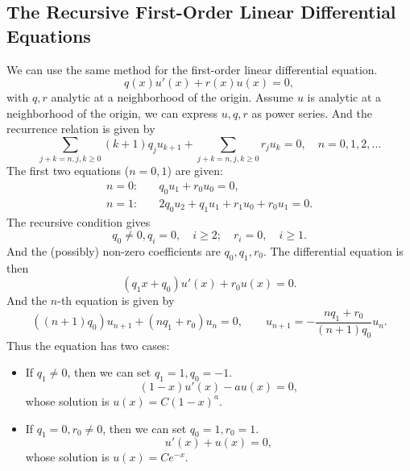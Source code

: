\documentclass[../main.tex]{subfiles}
\begin{document}
\subsection{The Recursive First-Order Linear Differential Equations}
We can use the same method for the first-order linear differential equation.
\begin{equation}
	q(x) u'(x) + r(x) u(x) = 0,
\end{equation}
with $q,r$ analytic at a neighborhood of the origin. Assume $u$ is analytic at a neighborhood of the origin, we can express $u,q,r$ as power series. And the recurrence relation is given by
\begin{equation}
	\sum_{j+k=n, j,k \geq 0} (k+1) q_j u_{k+1} + \sum_{j+k=n, j,k \geq 0} r_j u_k = 0, \quad n=0,1,2,\ldots
\end{equation}
The first two equations ($n=0,1$) are given:
\begin{equation*}
	\begin{aligned}
		n=0: \quad & q_0 u_1 + r_0 u_0 = 0, \\
		n=1: \quad & 2 q_0 u_2 + q_1 u_1 + r_1 u_0 + r_0 u_1 = 0.
	\end{aligned}
\end{equation*}
The recursive condition gives
\begin{equation*}
	q_0\neq 0, q_i=0, \quad i \geq 2; \quad r_i=0, \quad i \geq 1.
\end{equation*}
And the (possibly) non-zero coefficients are $q_0, q_1, r_0$. The differential equation is then
\begin{equation}
	(q_1 x + q_0) u'(x) + r_0 u(x) = 0.
\end{equation}
And the $n$-th equation is given by
\begin{equation}
	((n+1) q_0) u_{n+1} + (n q_1 + r_0) u_n = 0, \qquad u_{n+1} = -\frac{n q_1 + r_0}{(n+1) q_0} u_n.
\end{equation}
Thus the equation has two cases:
\begin{itemize}
	\item If $q_1 \neq 0$, then we can set $q_1=1, q_0=-1$.
		\begin{equation}
			(1 - x) u'(x) - a u(x) = 0,
		\end{equation}
		whose solution is $u(x) = C (1 - x)^a$.
	\item If $q_1=0, r_0 \neq 0$, then we can set $q_0=1, r_0=1$.
		\begin{equation}
			u'(x) + u(x) = 0,
		\end{equation}
		whose solution is $u(x) = C e^{-x}$.
\end{itemize}
\end{document}
